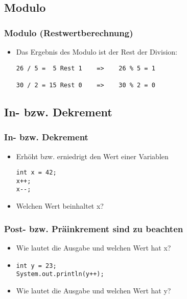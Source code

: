 \documentclass[final]{beamer}
\begin{document}
\subsection{Modulo}
\begin{frame}[fragile]
  \frametitle{Modulo (Restwertberechnung)}
  \begin{itemize}
    \item Das Ergebnis des Modulo ist der Rest der Division:
    \begin{lstlisting}
26 / 5 =  5 Rest 1    =>    26 % 5 = 1

30 / 2 = 15 Rest 0    =>    30 % 2 = 0
    \end{lstlisting}
  \end{itemize}
\end{frame}

\subsection{In- bzw. Dekrement}
\begin{frame}[fragile]
  \frametitle{In- bzw. Dekrement}
  \begin{itemize}
    \item Erhöht bzw. erniedrigt den Wert einer Variablen
    \begin{lstlisting}
int x = 42;
x++; 
x--;
    \end{lstlisting}
\item[] Welchen Wert beinhaltet x? 
  \end{itemize}
\end{frame}

\begin{frame}[fragile]
\frametitle{Post- bzw. Präinkrement sind zu beachten}
\begin{itemize}
    \begin{lstlisting}
int x = 23;
System.out.println(++x);
\end{lstlisting}
\item[] Wie lautet die Ausgabe und welchen Wert hat x? 
\item[]\quad
\begin{lstlisting}
int y = 23;
System.out.println(y++);
    \end{lstlisting}
\item[] Wie lautet die Ausgabe und welchen Wert hat y? 
  \end{itemize}
\end{frame}
\end{document}
